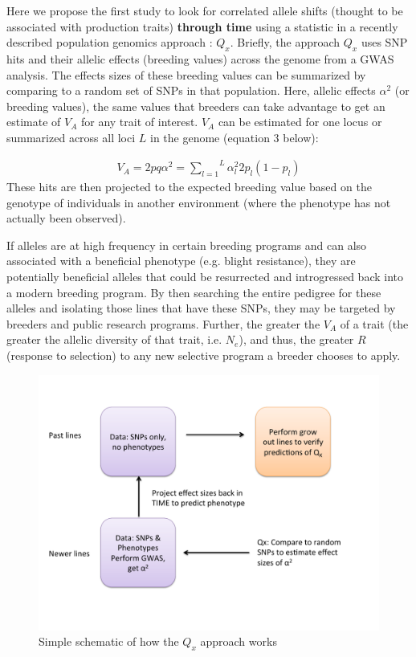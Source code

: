 \documentclass[12pt]{article}
\begin{document}
Here we propose the first study to look for correlated allele shifts (thought to be associated with production traits) \textbf{through time} using a statistic in a recently described population genomics approach \cite{Berg:2014bs}: $Q_{x}$. 
Briefly, the approach $Q_{x}$ uses SNP hits and their allelic effects (breeding values) across the genome from a GWAS analysis. The effects sizes of these breeding values can be summarized by comparing to a random set of SNPs in that population. Here, allelic effects $\alpha^{2}$ (or breeding values), the same values that  breeders can take advantage to get an estimate of $V_{A}$ for any trait of interest. $V_{A}$ can be estimated for one locus or summarized across all loci $L$ in the genome (equation 3 below):

  \begin{align}
    V_A = 2pq\alpha^2
     = \overset{L}{\underset{l=1}{\sum}}\alpha^2_l2p_l(1-p_l)
  \end{align}
These hits are then projected to the expected breeding value based on the genotype of individuals in another environment (where the phenotype has not actually been observed). 

If alleles are at high frequency in certain breeding programs and can also associated with a beneficial phenotype (e.g. blight resistance), they are potentially beneficial alleles that could be resurrected and introgressed back into a modern breeding program. 
By then searching the entire pedigree for these alleles and isolating those lines that have these SNPs, they may be targeted by breeders and public research programs.
Further, the greater the $V_A$ of a trait (the greater the allelic diversity of that trait, i.e. $N_{e}$), and thus, the greater $R$ (response to selection) to any new selective program a breeder chooses to apply.

\begin{figure}
\includegraphics[width=0.7\linewidth]{Qx.pdf}
\caption{Simple schematic of how the $Q_{x}$ approach works}
\label{fig:qx}
\end{figure}
\end{document}
